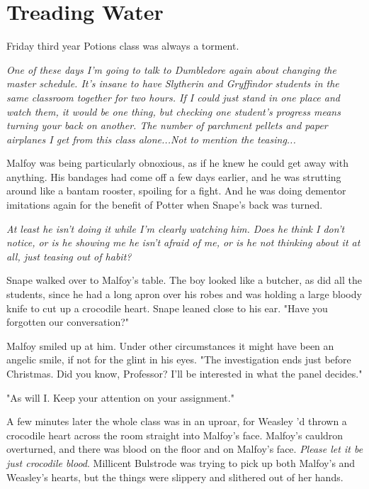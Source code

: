
\chapter{Treading Water}

Friday third year Potions class was always a torment.

\emph{One of these days I'm going to talk to Dumbledore again about changing the master schedule. It's insane to have Slytherin and Gryffindor students in the same classroom together for two hours. If I could just stand in one place and watch them, it would be one thing, but checking one student's progress means turning your back on another. The number of parchment pellets and paper airplanes I get from this class alone...Not to mention the teasing...}

Malfoy was being particularly obnoxious, as if he knew he could get away with anything. His bandages had come off a few days earlier, and he was strutting around like a bantam rooster, spoiling for a fight. And he was doing dementor imitations again for the benefit of Potter when Snape's back was turned.

\emph{At least he isn't doing it while I'm clearly watching him. Does he think I don't notice, or is he showing me he isn't afraid of me, or is he not thinking about it at all, just teasing out of habit?}

Snape walked over to Malfoy's table. The boy looked like a butcher, as did all the students, since he had a long apron over his robes and was holding a large bloody knife to cut up a crocodile heart. Snape leaned close to his ear. "Have you forgotten our conversation?"

Malfoy smiled up at him. Under other circumstances it might have been an angelic smile, if not for the glint in his eyes. "The investigation ends just before Christmas. Did you know, Professor? I'll be interested in what the panel decides."

"As will I. Keep your attention on your assignment."

A few minutes later the whole class was in an uproar, for Weasley 'd thrown a crocodile heart across the room straight into Malfoy's face. Malfoy's cauldron overturned, and there was blood on the floor and on Malfoy's face. \emph{Please let it be just crocodile blood}. Millicent Bulstrode was trying to pick up both Malfoy's and Weasley's hearts, but the things were slippery and slithered out of her hands.

